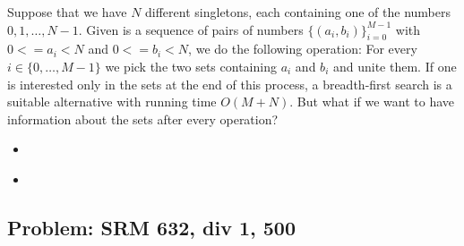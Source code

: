 \documentclass[a4paper, twoside,openany]{book}
\newcommand{\insertcode}[2]{\begin{itemize}\item[]\end{itemize}} %
\begin{document}
Suppose that we have $N$ different singletons, each containing one of the numbers $0, 1, \ldots, N-1$. Given is a sequence of pairs of numbers $\{(a_i, b_i)\}_{i=0}^{M-1}$ with $0 <= a_i <  N$ and $0 <= b_i <  N$, we do the following operation: For every $i \in \{0, \ldots, M-1\}$ we pick the two sets containing $a_i$ and $b_i$ and unite them. If one is interested only in the sets at the end of this process, a breadth-first search is a suitable alternative with running time $O(M+N)$. But what if we want to have information about the sets after every operation?

\insertcode{"codes/union_find.cpp"}{A union-find algorithm with only \emph{path compression}.}

\insertcode{"codes/union_find_rank.cpp"}{A union-find algorithm with \emph{path compression} and \emph{union by rank}.}

\subsection{Problem: SRM 632, div 1, 500}
\end{document}
